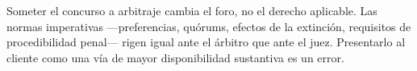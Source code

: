 \begin{alerta}
Someter el concurso a arbitraje cambia el foro, no el derecho aplicable. Las normas
imperativas ---preferencias, quórums, efectos de la extinción, requisitos de procedibilidad
penal--- rigen igual ante el árbitro que ante el juez. Presentarlo al cliente como una vía de
mayor disponibilidad sustantiva es un error.
\end{alerta}

